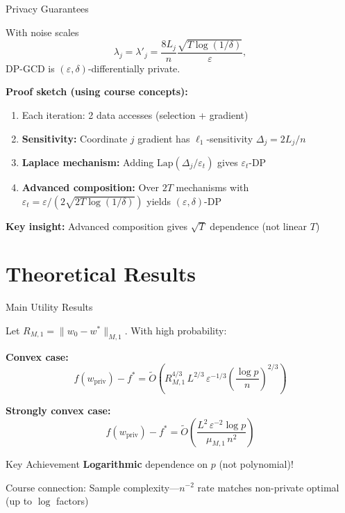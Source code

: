 \documentclass{beamer}
\begin{document}
\begin{frame}{Privacy Guarantees}
\begin{theorem}
With noise scales
\[
\lambda_j = \lambda'_j = \frac{8 L_j}{n} \frac{\sqrt{T \log(1/\delta)}}{\varepsilon},
\]
DP-GCD is $(\varepsilon, \delta)$-differentially private.
\end{theorem}

\vspace{0.5em}

\textbf{Proof sketch (using course concepts):}
\begin{enumerate}
\item Each iteration: 2 data accesses (selection + gradient)
\item \textbf{Sensitivity:} Coordinate $j$ gradient has $\ell_1$-sensitivity $\Delta_j = 2L_j/n$
\item \textbf{Laplace mechanism:} Adding $\mathrm{Lap}(\Delta_j/\varepsilon_t)$ gives $\varepsilon_t$-DP
\item \textbf{Advanced composition:} Over $2T$ mechanisms with $\varepsilon_t = \varepsilon/(2\sqrt{2T\log(1/\delta)})$ yields $(\varepsilon, \delta)$-DP
\end{enumerate}

\vspace{0.5em}

\textbf{Key insight:} Advanced composition gives $\sqrt{T}$ dependence (not linear $T$)
\end{frame}

\section{Theoretical Results}

\begin{frame}{Main Utility Results}
\begin{theorem}
Let $R_{M,1} = \|w_0 - w^*\|_{M,1}$. With high probability:

\vspace{0.5em}

\textbf{Convex case:}
\[
f(w_{\text{priv}}) - f^* = \widetilde{O}\!\left( R_{M,1}^{4/3} \, L^{2/3} \, \varepsilon^{-1/3} \left(\frac{\log p}{n}\right)^{2/3} \right)
\]

\textbf{Strongly convex case:}
\[
f(w_{\text{priv}}) - f^* = \widetilde{O}\!\left( \frac{L^2 \, \varepsilon^{-2} \log p}{\mu_{M,1} \, n^2} \right)
\]
\end{theorem}

\vspace{1em}

\begin{alertblock}{Key Achievement}
\textbf{Logarithmic} dependence on $p$ (not polynomial)!
\end{alertblock}

\vspace{0.3em}

\alert{Course connection:} Sample complexity—$n^{-2}$ rate matches non-private optimal (up to $\log$ factors)
\end{frame}
\end{document}
